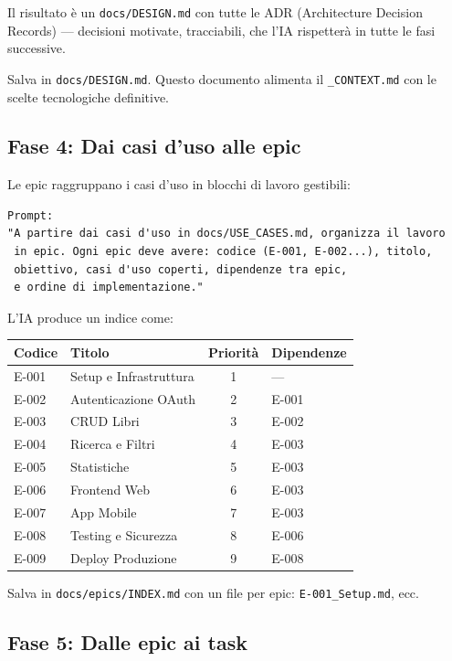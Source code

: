 Il risultato è un \texttt{docs/DESIGN.md} con tutte le ADR (Architecture Decision Records) --- decisioni motivate, tracciabili, che l'IA rispetterà in tutte le fasi successive.

Salva in \texttt{docs/DESIGN.md}. Questo documento alimenta il \texttt{\_CONTEXT.md} con le scelte tecnologiche definitive.

\subsection{Fase 4: Dai casi d'uso alle epic}

Le epic raggruppano i casi d'uso in blocchi di lavoro gestibili:

\begin{lstlisting}[language={}]
Prompt:
"A partire dai casi d'uso in docs/USE_CASES.md, organizza il lavoro
 in epic. Ogni epic deve avere: codice (E-001, E-002...), titolo,
 obiettivo, casi d'uso coperti, dipendenze tra epic,
 e ordine di implementazione."
\end{lstlisting}

L'IA produce un indice come:

\begin{center}
\begin{tabularx}{\textwidth}{l l c l}
\toprule
\textbf{Codice} & \textbf{Titolo} & \textbf{Priorità} & \textbf{Dipendenze} \\
\midrule
E-001 & Setup e Infrastruttura & 1 & --- \\
E-002 & Autenticazione OAuth & 2 & E-001 \\
E-003 & CRUD Libri & 3 & E-002 \\
E-004 & Ricerca e Filtri & 4 & E-003 \\
E-005 & Statistiche & 5 & E-003 \\
E-006 & Frontend Web & 6 & E-003 \\
E-007 & App Mobile & 7 & E-003 \\
E-008 & Testing e Sicurezza & 8 & E-006 \\
E-009 & Deploy Produzione & 9 & E-008 \\
\bottomrule
\end{tabularx}
\end{center}

Salva in \texttt{docs/epics/INDEX.md} con un file per epic: \texttt{E-001\_Setup.md}, ecc.

\subsection{Fase 5: Dalle epic ai task}

